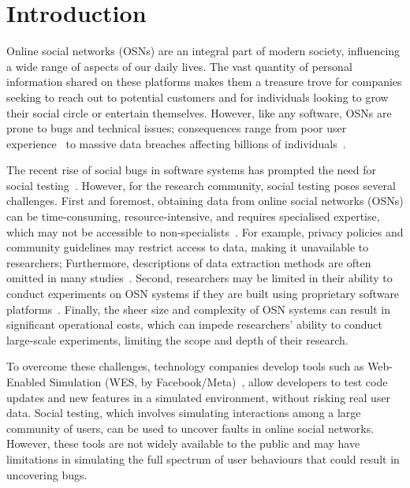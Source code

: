 \documentclass[dvipsnames,format=sigconf,anonymous=False,review=false, balance=false]{acmart}
\begin{document}
\section{Introduction}
Online social networks (OSNs) are an integral part of modern society, influencing a wide range of aspects of our daily lives. The vast quantity of personal information shared on these platforms makes them a treasure trove for companies seeking to reach out to potential customers and for individuals looking to grow their social circle or entertain themselves. However, like any software, OSNs are prone to bugs and technical issues; consequences range from poor user experience~\cite{brodkin2022socialapp,day2015socialbugs} to massive data breaches affecting billions of individuals~\cite{morahan2022dataleaks}.

The recent rise of social bugs in software systems has prompted the need for social testing~\cite{ahlgren2020wes}. However, for the research community, social testing poses several challenges. 
First and foremost, obtaining data from online social networks (OSNs) can be time-consuming, resource-intensive, and requires specialised expertise, which may not be accessible to non-specialists~\cite{https://doi.org/10.48550/arxiv.1612.04666}. For example, privacy policies and community guidelines may restrict access to data, making it unavailable to researchers; Furthermore, descriptions of data extraction methods are often omitted in many studies~\cite{info:doi/10.2196/13544}. 
Second, researchers may be limited in their ability to conduct experiments on OSN systems if they are built using proprietary software platforms~\cite{ahlgren2020wes}. 
Finally, the sheer size and complexity of OSN systems can result in significant operational costs, which can impede researchers' ability to conduct large-scale experiments, limiting the scope and depth of their research.

To overcome these challenges, technology companies develop tools such as Web-Enabled Simulation (WES, by Facebook/Meta)~\cite{ahlgren2020wes}, allow developers to test code updates and new features in a simulated environment, without risking real user data. 
Social testing, which involves simulating interactions among a large community of users, can be used to uncover faults in online social networks. 
However, these tools are not widely available to the public and may have limitations in simulating the full spectrum of user behaviours that could result in uncovering bugs. 
\end{document}
